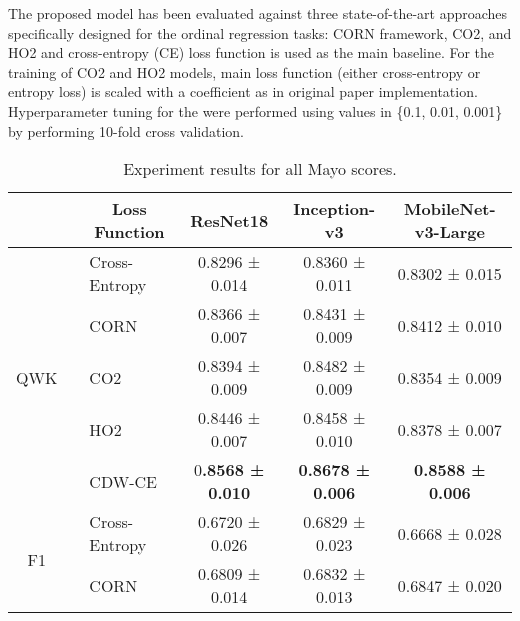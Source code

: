 \documentclass[runningheads]{llncs}
\begin{document}
The proposed model has been evaluated against three state-of-the-art approaches specifically designed for the ordinal regression tasks: CORN framework, CO2, and HO2 and cross-entropy (CE) loss function is used as the main baseline. For the training of CO2 and HO2 models, main loss function (either cross-entropy or entropy loss) is scaled with a  coefficient as in original paper implementation. Hyperparameter tuning for the  were performed using values in \{0.1, 0.01, 0.001\} by performing 10-fold cross validation.

\begin{table}[t!]
\caption{Experiment results for all Mayo scores.}
\label{tab:experiment_results_mayo_scores}
\begin{adjustbox}{center}
\begin{tabular}{cllccc} 
\hline
                          & \multicolumn{1}{c}{} & \multicolumn{1}{c}{\textbf{Loss Function}} & \textbf{ResNet18}       & \textbf{Inception-v3}   & \textbf{MobileNet-v3-Large}  \\ 
\hline
\multirow{5}{*}{QWK}      &                      & Cross-Entropy                              & 0.8296 ± 0.014          & 0.8360 ± 0.011          & 0.8302 ± 0.015               \\
                          &                      & CORN                                       & 0.8366 ± 0.007          & 0.8431 ± 0.009          & 0.8412 ± 0.010               \\
                          &                      & CO2                                        & 0.8394 ± 0.009          & 0.8482 ± 0.009          & 0.8354 ± 0.009               \\
                          &                      & HO2                                        & 0.8446 ± 0.007          & 0.8458 ± 0.010          & 0.8378 ± 0.007               \\
                          &                      & CDW-CE                                     & 0\textbf{.8568 ± 0.010} & \textbf{0.8678 ± 0.006} & \textbf{0.8588 ± 0.006}      \\ 
\hline
\multirow{5}{*}{F1}       &                      & Cross-Entropy                              & 0.6720 ± 0.026          & 0.6829 ± 0.023          & 0.6668 ± 0.028               \\
                          &                      & CORN                                       & 0.6809 ± 0.014          & 0.6832 ± 0.013          & 0.6847 ± 0.020               \\

\end{tabular}
\end{adjustbox}
\end{table}
\end{document}

